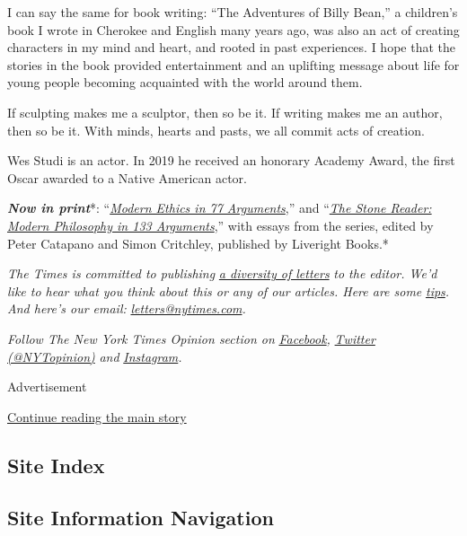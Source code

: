 I can say the same for book writing: ``The Adventures of Billy Bean,'' a
children's book I wrote in Cherokee and English many years ago, was also
an act of creating characters in my mind and heart, and rooted in past
experiences. I hope that the stories in the book provided entertainment
and an uplifting message about life for young people becoming acquainted
with the world around them.

If sculpting makes me a sculptor, then so be it. If writing makes me an
author, then so be it. With minds, hearts and pasts, we all commit acts
of creation.

Wes Studi is an actor. In 2019 he received an honorary Academy Award,
the first Oscar awarded to a Native American actor.

\emph{\textbf{Now in print}}*:
``\emph{\href{http://bitly.com/1MW2kN3}{\emph{Modern Ethics in 77
Arguments}}},'' and ``\emph{\href{http://bitly.com/1MW2kN3}{\emph{The
Stone Reader: Modern Philosophy in 133 Arguments}}},'' with essays from
the series, edited by Peter Catapano and Simon Critchley, published by
Liveright Books.*

\emph{The Times is committed to publishing}
\href{https://www.nytimes.com/2019/01/31/opinion/letters/letters-to-editor-new-york-times-women.html}{\emph{a
diversity of letters}} \emph{to the editor. We'd like to hear what you
think about this or any of our articles. Here are some}
\href{https://help.nytimes.com/hc/en-us/articles/115014925288-How-to-submit-a-letter-to-the-editor}{\emph{tips}}\emph{.
And here's our email:}
\href{mailto:letters@nytimes.com}{\emph{letters@nytimes.com}}\emph{.}

\emph{Follow The New York Times Opinion section on}
\href{https://www.facebook.com/nytopinion}{\emph{Facebook}}\emph{,}
\href{http://twitter.com/NYTOpinion}{\emph{Twitter (@NYTopinion)}}
\emph{and}
\href{https://www.instagram.com/nytopinion/}{\emph{Instagram}}\emph{.}

Advertisement

\protect\hyperlink{after-bottom}{Continue reading the main story}

\hypertarget{site-index}{%
\subsection{Site Index}\label{site-index}}

\hypertarget{site-information-navigation}{%
\subsection{Site Information
Navigation}\label{site-information-navigation}}

